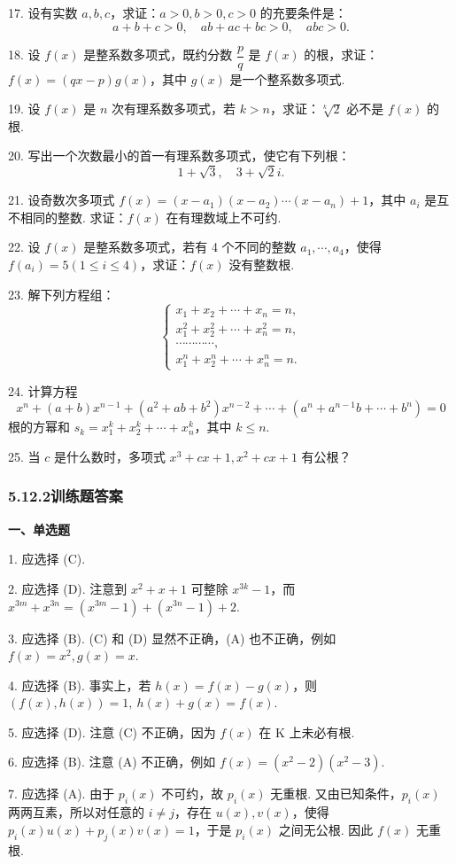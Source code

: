 \documentclass[UTF8,12pt,a4paper,fontset=fandol]{ctexart}
\begin{document}
17. 设有实数 $a,b,c$，求证：$a>0,b>0,c>0$ 的充要条件是：
\[
a+b+c>0,\quad ab+ac+bc>0,\quad abc>0.
\]

18. 设 $f(x)$ 是整系数多项式，既约分数 $\dfrac{p}{q}$ 是 $f(x)$ 的根，求证：$f(x)=(qx-p)g(x)$，其中 $g(x)$ 是一个整系数多项式.

19. 设 $f(x)$ 是 $n$ 次有理系数多项式，若 $k>n$，求证：$\sqrt[k]{2}$ 必不是 $f(x)$ 的根.

20. 写出一个次数最小的首一有理系数多项式，使它有下列根：
\[
1+\sqrt{3},\quad 3+\sqrt{2}i.
\]

21. 设奇数次多项式 $f(x)=(x-a_1)(x-a_2)\cdots(x-a_n)+1$，其中 $a_i$ 是互不相同的整数. 求证：$f(x)$ 在有理数域上不可约.

22. 设 $f(x)$ 是整系数多项式，若有 4 个不同的整数 $a_1,\cdots,a_4$，使得 $f(a_i)=5(1\le i\le4)$，求证：$f(x)$ 没有整数根.

23. 解下列方程组：
\[
\begin{cases}
x_1+x_2+\cdots+x_n=n,\\
x_1^2+x_2^2+\cdots+x_n^2=n,\\
\cdots\cdots\cdots\cdots,\\
x_1^n+x_2^n+\cdots+x_n^n=n.
\end{cases}
\]

24. 计算方程
\[
x^n+(a+b)x^{n-1}+(a^2+ab+b^2)x^{n-2}+\cdots+(a^n+a^{n-1}b+\cdots+b^n)=0
\]
根的方幂和 $s_k=x_1^k+x_2^k+\cdots+x_n^k$，其中 $k\le n$.

25. 当 $c$ 是什么数时，多项式 $x^3+cx+1,x^2+cx+1$ 有公根？

\subsubsection*{5.12.2\quad 训练题答案}

\noindent\textbf{一、单选题}

1. 应选择 (C).

2. 应选择 (D). 注意到 $x^2+x+1$ 可整除 $x^{3k}-1$，而 $x^{3m}+x^{3n}=(x^{3m}-1)+(x^{3n}-1)+2$.

3. 应选择 (B). (C) 和 (D) 显然不正确，(A) 也不正确，例如 $f(x)=x^2,g(x)=x$.

4. 应选择 (B). 事实上，若 $h(x)=f(x)-g(x)$，则 $(f(x),h(x))=1,\ h(x)+g(x)=f(x)$.

5. 应选择 (D). 注意 (C) 不正确，因为 $f(x)$ 在 K 上未必有根.

6. 应选择 (B). 注意 (A) 不正确，例如 $f(x)=(x^2-2)(x^2-3)$.

7. 应选择 (A). 由于 $p_i(x)$ 不可约，故 $p_i(x)$ 无重根. 又由已知条件，$p_i(x)$ 两两互素，所以对任意的 $i\ne j$，存在 $u(x),v(x)$，使得 $p_i(x)u(x)+p_j(x)v(x)=1$，于是 $p_i(x)$ 之间无公根. 因此 $f(x)$ 无重根.
\end{document}
